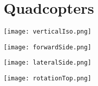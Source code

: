 \chapter{Quadcopters}

\texttt{[image: verticalIso.png]}

\texttt{[image: forwardSide.png]}

\texttt{[image: lateralSide.png]}

\texttt{[image: rotationTop.png]}



